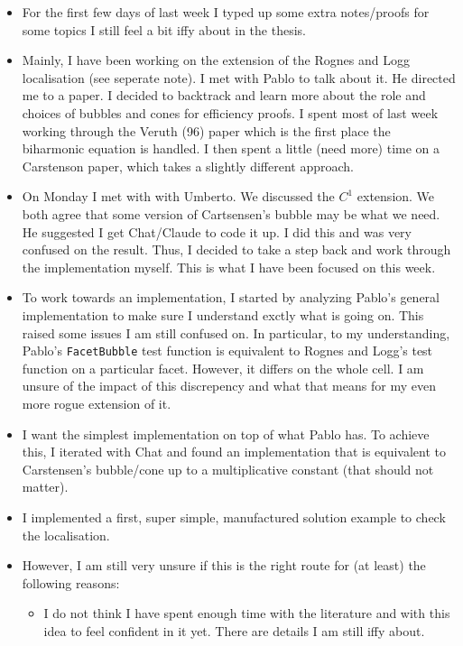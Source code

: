\documentclass[12pt,a4paper]{article}
\begin{document}
\begin{itemize}

    \item For the first few days of last week I typed up some extra notes/proofs for some topics I still feel a bit iffy about in the thesis.   
    \item Mainly, I have been working on the extension of the Rognes and Logg localisation (see seperate note). I met with Pablo to talk about it. He directed me to a paper. I decided to backtrack and learn more about the role and choices of bubbles and cones for efficiency proofs. I spent most of last week working through the Veruth (96) paper which is the first place the biharmonic equation is handled. I then spent a little (need more) time on a Carstenson paper, which takes a slightly different approach. 
    \item On Monday I met with with Umberto. We discussed the $C^1$ extension. We both agree that some version of Cartsensen's bubble may be what we need. He suggested I get Chat/Claude to code it up. I did this and was very confused on the result. Thus, I decided to take a step back and work through the implementation myself. This is what I have been focused on this week. 
    \item To work towards an implementation, I started by analyzing Pablo's general implementation to make sure I understand exctly what is going on. This raised some issues I am still confused on. In particular, to my understanding, Pablo's \texttt{FacetBubble} test function is equivalent to Rognes and Logg's test function on a particular facet. However, it differs on the whole cell. I am unsure of the impact of this discrepency and what that means for my even more rogue extension of it. 
    \item I want the simplest implementation on top of what Pablo has. To achieve this, I iterated with Chat and found an implementation that is equivalent to Carstensen's bubble/cone up to a multiplicative constant (that should not matter). 
    \item I implemented a first, super simple, manufactured solution example to check the localisation.
    \item However, I am still very unsure if this is the right route for (at least) the following reasons:
    \begin{itemize}
        \item I do not think I have spent enough time with the literature and with this idea to feel confident in it yet. There are details I am still iffy about. 

\end{itemize}
\end{itemize}
\end{document}
